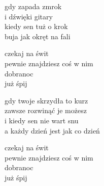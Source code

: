 \begin{text}
    gdy zapada zmrok\\
    i dźwięki gitary\\
    kiedy sen tuż o krok\\
    buja jak okręt na fali

    \vin czekaj na świt\\
    \vin pewnie znajdziesz coś w nim\\
    \vin dobranoc\\
    \vin już śpij

    gdy twoje skrzydła to kurz\\
    zawsze rozwinąć je możesz\\
    i kiedy sen nie wart snu\\
    a każdy dzień jest jak co dzień

    \vin czekaj na świt\\
    \vin pewnie znajdziesz coś w nim\\
    \vin dobranoc\\
    \vin już śpij
\end{text}
\begin{chord}

\end{chord}
